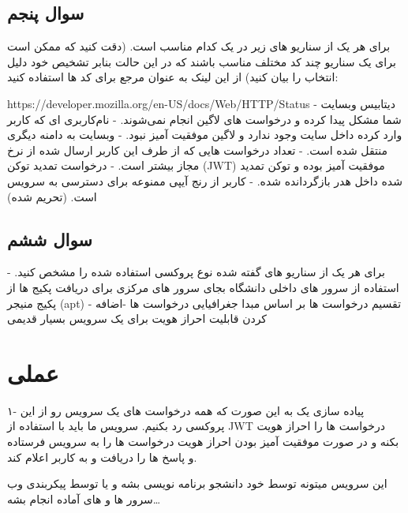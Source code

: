 \documentclass{../assignment}
\begin{document}
\subsection{سوال پنجم}
برای هر یک از سناریو های زیر در یک  کدام  مناسب است. (دقت کنید که ممکن است برای یک سناریو چند کد مختلف مناسب باشند که در این حالت بنابر تشخیص خود دلیل انتخاب را بیان کنید)
\linebreak
از این لینک به عنوان مرجع برای کد ها استفاده کنید:

\hfill
https://developer.mozilla.org/en-US/docs/Web/HTTP/Status
\linebreak
{}- دیتابیس وبسایت شما مشکل پیدا کرده و درخواست های لاگین انجام نمی‌شوند.
- نام‌کاربری ای که کاربر وارد کرده داخل سایت وجود ندارد و لاگین موفقیت آمیز نبود.
- وبسایت به دامنه دیگری منتقل شده است.
- تعداد درخواست هایی که از طرف این کاربر ارسال شده از نرخ مجاز بیشتر است.
- درخواست تمدید توکن (JWT) موفقیت آمیز بوده و توکن تمدید شده داخل هدر بازگردانده شده.
- کاربر از رنج آیپی ممنوعه برای دسترسی به سرویس است. (تحریم شده)
\subsection{سوال ششم}
برای هر یک از سناریو های گفته شده نوع پروکسی استفاده شده را مشخص کنید.
\linebreak
{}- استفاده از سرور های داخلی دانشگاه بجای سرور های مرکزی برای دریافت پکیج ها از پکیج منیجر (apt)
- تقسیم درخواست ها بر اساس مبدا جغرافیایی درخواست ها
-اضافه کردن قابلیت احراز هویت برای یک سرویس بسیار قدیمی 
\section{عملی}

۱- پیاده سازی یک  به این صورت که همه درخواست های یک سرویس رو از این پروکسی رد بکنیم. سرویس ما باید با استفاده از JWT درخواست ها را احراز هویت بکنه و در صورت موفقیت آمیز بودن احراز هویت درخواست ها را به سرویس فرستاده و پاسخ ها را دریافت و به کاربر اعلام کند.

این سرویس میتونه توسط خود دانشجو برنامه نویسی بشه و یا توسط پیکربندی وب سرور ها و  های آماده انجام بشه…
\end{document}
